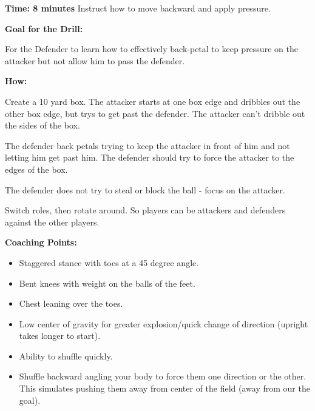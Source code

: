 \documentclass[10pt,letterpaper]{article}
\newenvironment{evenBlock}[1]{%
    \tcolorbox[beamer,%
    noparskip,breakable,
    colback=LightGreen,colframe=DarkGreen,%
    colbacklower=LimeGreen!75!LightGreen,%
    title=#1]}%
    {\endtcolorbox}
\begin{document}
\textbf{Time: 8 minutes}
\begin{evenBlock}{Back-Petal}
Instruct how to move backward and apply pressure.

\textbf{Goal for the Drill:}

For the Defender to learn how to effectively back-petal to keep pressure on the attacker but not allow him to pass the defender.


\textbf{How:}

Create a 10 yard box.  The attacker starts at one box edge and dribbles out the other box edge, but trys to get past the defender.  The attacker can't dribble out the sides of the box.

The defender back petals trying to keep the attacker in front of him and not letting him get past him.  The defender should try to force the attacker to the edges of the box.

The defender does not try to steal or block the ball - focus on the attacker.

Switch roles, then rotate around.  So players can be attackers and defenders against the other players.

\textbf{Coaching Points:}
\begin{itemize}
    \item Staggered stance with toes at a 45 degree angle.
    \item Bent knees with weight on the balls of the feet.
    \item Chest leaning over the toes.
    \item Low center of gravity for greater explosion/quick change of direction (upright takes longer to start).
    \item Ability to shuffle quickly.
    \item Shuffle backward  angling your body to force them one direction or the other.  This simulates pushing them away from center of the field (away from our the goal).
\end{itemize}

\end{evenBlock}
\end{document}
